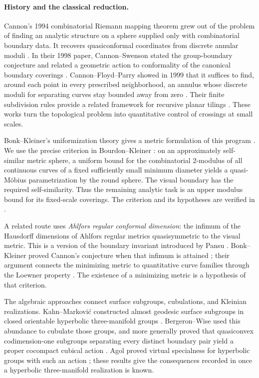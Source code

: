 \documentclass[11pt]{article}
\numberwithin{equation}{section}
\theoremstyle{definition}
\theoremstyle{remark}
\begin{document}
\paragraph{History and the classical reduction.}
Cannon's 1994 combinatorial Riemann mapping theorem grew out of the
problem of finding an analytic structure on a sphere supplied only
with combinatorial boundary data. It recovers quasiconformal
coordinates from discrete annular moduli \cite[pp.~155--160]{Cannon}.
In their 1998 paper, Cannon--Swenson stated the group-boundary conjecture
and related a geometric action to conformality of the canonical boundary coverings
\cite[Theorem 5.1 and Conjecture 5.1]{CannonSwenson}.
Cannon--Floyd--Parry showed in 1999 that it suffices to find, around
each point in every prescribed neighborhood, an annulus whose discrete
moduli for separating curves stay bounded away from zero
\cite[Theorem 8.2]{CFP}.
Their finite subdivision rules provide a related framework for recursive
planar tilings \cite{CFPFiniteSubdivision}.
These works turn the topological problem into quantitative control of
crossings at small scales.

Bonk--Kleiner's uniformization theory gives a metric formulation of
this program \cite{BK}. We use the precise criterion in
Bourdon--Kleiner \cite[Corollary 3.5]{BourdonKleiner}: on an
approximately self-similar metric sphere, a uniform bound for the
combinatorial $2$-modulus of all continuous curves of a fixed sufficiently
small minimum diameter yields a quasi-M\"obius parametrization by the
round sphere. The visual boundary has the required self-similarity.
Thus the remaining analytic task is an upper modulus bound for its
fixed-scale coverings. The criterion and its hypotheses are verified
in .

A related route uses \emph{Ahlfors regular conformal dimension}: the
infimum of the Hausdorff dimensions of Ahlfors regular metrics
quasisymmetric to the visual metric. This is a version of the
boundary invariant introduced by Pansu \cite{Pansu1989}.
Bonk--Kleiner proved Cannon's conjecture when that infimum is attained
\cite[Theorem 1.1]{BKConformalDimension}; their argument connects the
minimizing metric to quantitative curve families through the Loewner
property \cite[Theorem 1.3]{BKConformalDimension}. The existence of a
minimizing metric is a hypothesis of that criterion.

The algebraic approaches connect surface subgroups, cubulations, and
Kleinian realizations. Kahn--Markovi\'c constructed almost geodesic
surface subgroups in closed orientable hyperbolic three-manifold groups
\cite[Theorems 1.1--1.2]{KahnMarkovic}. Bergeron--Wise used this
abundance to cubulate those groups, and more generally proved that
quasiconvex codimension-one subgroups separating every distinct boundary
pair yield a proper cocompact cubical action
\cite[Theorem 1.4 and Section 5]{BergeronWise}.
Agol proved virtual specialness for hyperbolic groups with such an
action \cite[Theorem 1.1]{Agol}; these results give the consequences
recorded in  once a hyperbolic three-manifold
realization is known.
\end{document}
